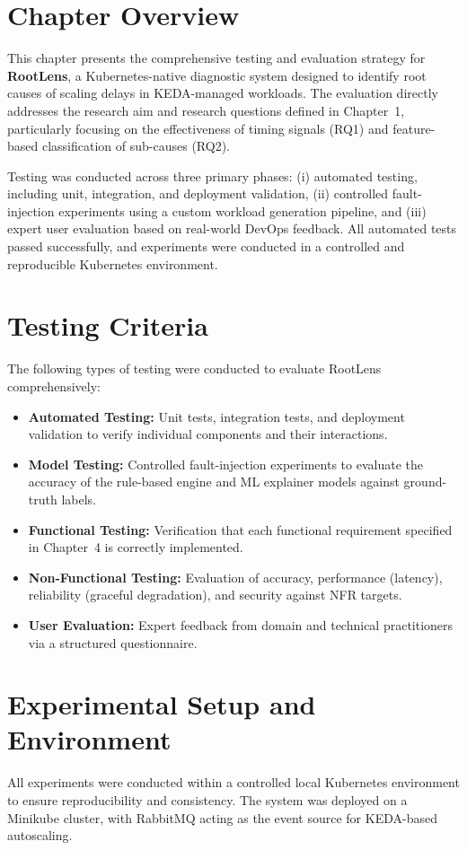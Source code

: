 
\section{Chapter Overview}
This chapter presents the comprehensive testing and evaluation strategy for \textbf{RootLens}, a Kubernetes-native diagnostic system designed to identify root causes of scaling delays in KEDA-managed workloads. The evaluation directly addresses the research aim and research questions defined in Chapter~1, particularly focusing on the effectiveness of timing signals (RQ1) and feature-based classification of sub-causes (RQ2).

Testing was conducted across three primary phases: (i) automated testing, including unit, integration, and deployment validation, (ii) controlled fault-injection experiments using a custom workload generation pipeline, and (iii) expert user evaluation based on real-world DevOps feedback. All automated tests passed successfully, and experiments were conducted in a controlled and reproducible Kubernetes environment.

\section{Testing Criteria}
The following types of testing were conducted to evaluate RootLens comprehensively:

\begin{itemize}
    \item \textbf{Automated Testing:} Unit tests, integration tests, and deployment validation to verify individual components and their interactions.
    \item \textbf{Model Testing:} Controlled fault-injection experiments to evaluate the accuracy of the rule-based engine and ML explainer models against ground-truth labels.
    \item \textbf{Functional Testing:} Verification that each functional requirement specified in Chapter~4 is correctly implemented.
    \item \textbf{Non-Functional Testing:} Evaluation of accuracy, performance (latency), reliability (graceful degradation), and security against NFR targets.
    \item \textbf{User Evaluation:} Expert feedback from domain and technical practitioners via a structured questionnaire.
\end{itemize}

\section{Experimental Setup and Environment}
All experiments were conducted within a controlled local Kubernetes environment to ensure reproducibility and consistency. The system was deployed on a Minikube cluster, with RabbitMQ acting as the event source for KEDA-based autoscaling.

